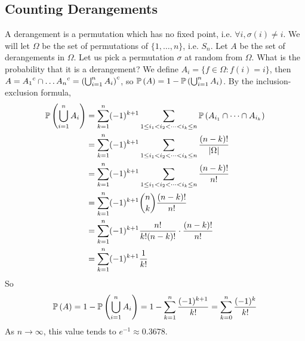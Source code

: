 \documentclass{article}
\begin{document}
\subsection{Counting Derangements}
A derangement is a permutation which has no fixed point, i.e. $\forall i, \sigma(i) \neq i$. We will let $\Omega$ be the set of permutations of $\{1, \dots, n\}$, i.e. $S_n$. Let $A$ be the set of derangements in $\Omega$. Let us pick a permutation $\sigma$ at random from $\Omega$. What is the probability that it is a derangement? We define $A_i = \{ f \in \Omega \colon f(i) = i \}$, then $A = {A_1}^c \cap \dots {A_n}^c = {\left( \bigcup_{i=1}^n A_i  \right)}^c$, so $\mathbb{P}\left({A}\right) = 1 - \mathbb{P}\left({\bigcup_{i=1}^n A_i}\right)$. By the inclusion-exclusion formula,
\begin{align*}
    \mathbb{P}\left({\bigcup_{i=1}^n A_i}\right) & = \sum_{k=1}^n (-1)^{k+1} \sum_{1 \leq i_1 < i_2 < \dots < i_k \leq n} \mathbb{P}\left({A_{i_1} \cap \dots \cap A_{i_k}}\right) \\
                               & = \sum_{k=1}^n (-1)^{k+1} \sum_{1 \leq i_1 < i_2 < \dots < i_k \leq n} \frac{(n-k)!}{\abs{\Omega}}            \\
                               & = \sum_{k=1}^n (-1)^{k+1} \sum_{1 \leq i_1 < i_2 < \dots < i_k \leq n} \frac{(n-k)!}{n!}                      \\
                               & = \sum_{k=1}^n (-1)^{k+1} \binom{n}{k} \frac{(n-k)!}{n!}                                                      \\
                               & = \sum_{k=1}^n (-1)^{k+1} \frac{n!}{k!(n-k)!} \cdot \frac{(n-k)!}{n!}                                         \\
                               & = \sum_{k=1}^n (-1)^{k+1} \frac{1}{k!}                                                                        \\
\end{align*}
So
\[ \mathbb{P}\left({A}\right) = 1 - \mathbb{P}\left({\bigcup_{i=1}^n A_i}\right) = 1 - \sum_{k=1}^n \frac{(-1)^{k+1}}{k!} = \sum_{k=0}^n \frac{(-1)^k}{k!} \]
As $n \to \infty$, this value tends to $e^{-1} \approx 0.3678$.
\end{document}

